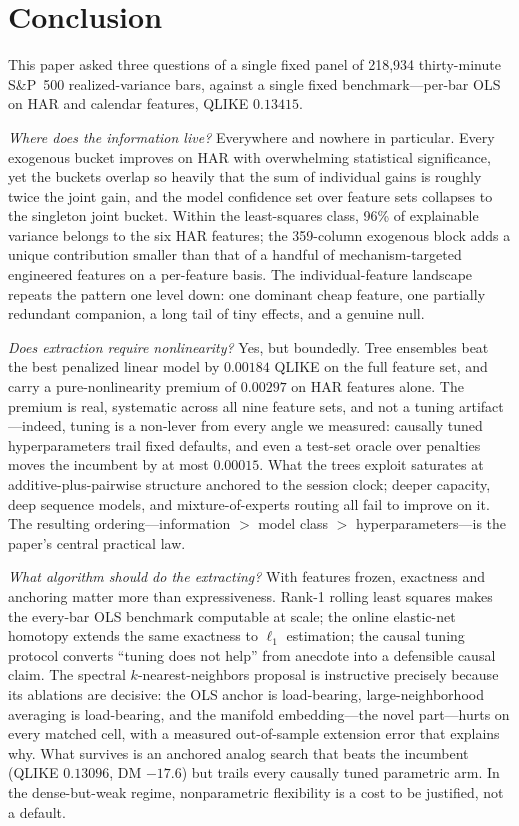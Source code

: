 \section{Conclusion}
\label{sec:conclusion}

This paper asked three questions of a single fixed panel of 218{,}934 thirty-minute S\&P~500 realized-variance bars, against a single fixed benchmark---per-bar OLS on HAR and calendar features, QLIKE $0.13415$.

\emph{Where does the information live?} Everywhere and nowhere in particular. Every exogenous bucket improves on HAR with overwhelming statistical significance, yet the buckets overlap so heavily that the sum of individual gains is roughly twice the joint gain, and the model confidence set over feature sets collapses to the singleton joint bucket. Within the least-squares class, 96\% of explainable variance belongs to the six HAR features; the 359-column exogenous block adds a unique contribution smaller than that of a handful of mechanism-targeted engineered features on a per-feature basis. The individual-feature landscape repeats the pattern one level down: one dominant cheap feature, one partially redundant companion, a long tail of tiny effects, and a genuine null.

\emph{Does extraction require nonlinearity?} Yes, but boundedly. Tree ensembles beat the best penalized linear model by $0.00184$ QLIKE on the full feature set, and carry a pure-nonlinearity premium of $0.00297$ on HAR features alone. The premium is real, systematic across all nine feature sets, and not a tuning artifact---indeed, tuning is a non-lever from every angle we measured: causally tuned hyperparameters trail fixed defaults, and even a test-set oracle over penalties moves the incumbent by at most $0.00015$. What the trees exploit saturates at additive-plus-pairwise structure anchored to the session clock; deeper capacity, deep sequence models, and mixture-of-experts routing all fail to improve on it. The resulting ordering---information $>$ model class $>$ hyperparameters---is the paper's central practical law.

\emph{What algorithm should do the extracting?} With features frozen, exactness and anchoring matter more than expressiveness. Rank-1 rolling least squares makes the every-bar OLS benchmark computable at scale; the online elastic-net homotopy extends the same exactness to $\ell_1$ estimation; the causal tuning protocol converts ``tuning does not help'' from anecdote into a defensible causal claim. The spectral $k$-nearest-neighbors proposal is instructive precisely because its ablations are decisive: the OLS anchor is load-bearing, large-neighborhood averaging is load-bearing, and the manifold embedding---the novel part---hurts on every matched cell, with a measured out-of-sample extension error that explains why. What survives is an anchored analog search that beats the incumbent (QLIKE $0.13096$, DM $-17.6$) but trails every causally tuned parametric arm. In the dense-but-weak regime, nonparametric flexibility is a cost to be justified, not a default.

